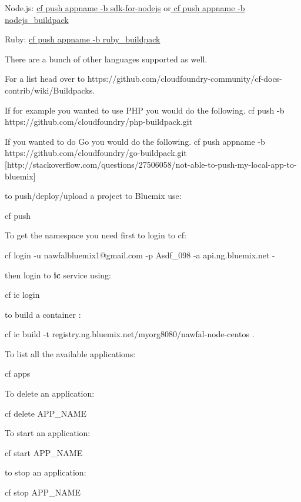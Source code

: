 \documentclass[]{book}
\begin{document}
Node.js: \underline{cf push appname -b sdk-for-nodejs} or\underline{ cf push appname -b nodejs\_buildpack}

Ruby: \underline{cf push appname -b ruby\_buildpack}

There are a bunch of other languages supported as well.

For a list head over to https://github.com/cloudfoundry-community/cf-docs-contrib/wiki/Buildpacks.

If for example you wanted to use PHP you would do the following. cf push -b https://github.com/cloudfoundry/php-buildpack.git

If you wanted to do Go you would do the following. cf push appname -b https://github.com/cloudfoundry/go-buildpack.git
[http://stackoverflow.com/questions/27506058/not-able-to-push-my-local-app-to-bluemix]




to push/deploy/upload a project to Bluemix use:
\begin{code}
cf push
\end{code}


To get the namespace you need first to login to cf:
\begin{code}
cf login -u nawfalbluemix1@gmail.com -p Asdf_098 -a api.ng.bluemix.net -
\end{code}

then login to \textbf{ic} service using: 
\begin{code}
cf ic login
\end{code}

to build a container :
\begin{code}
cf ic build -t registry.ng.bluemix.net/myorg8080/nawfal-node-centos .
\end{code}


To list all the available applications:
\begin{code}
cf apps
\end{code}

To delete an application:
\begin{code}
cf delete APP_NAME
\end{code}

To start an application: 
\begin{code}
cf start APP_NAME
\end{code}

to stop an application:
\begin{code}
cf stop APP_NAME
\end{code}
\end{document}
